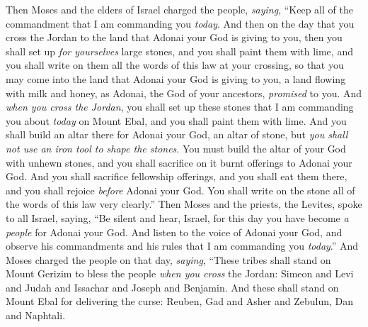 \begin{biblechapter} %
 Then Moses and the elders of Israel charged the people, \textit{saying}, “Keep all of the commandment that I am commanding you \textit{today}.
\verse And then on the day that you cross the Jordan to the land that Adonai your God is giving to you, then you shall set up \textit{for yourselves} large stones, and you shall paint them with lime,
\verse and you shall write on them all the words of this law at your crossing, so that you may come into the land that Adonai your God is giving to you, a land flowing with milk and honey, as Adonai, the God of your ancestors, \textit{promised} to you.
\verse And \textit{when you cross the Jordan}, you shall set up these stones that I am commanding you about \textit{today} on Mount Ebal, and you shall paint them with lime.
\verse And you shall build an altar there for Adonai your God, an altar of stone, but \textit{you shall not use an iron tool to shape the stones}.
\verse You must build the altar of your God with unhewn stones, and you shall sacrifice on it burnt offerings to Adonai your God.
\verse And you shall sacrifice fellowship offerings, and you shall eat them there, and you shall rejoice \textit{before} Adonai your God.
\verse You shall write on the stone all of the words of this law very clearly.”
\verse Then Moses and the priests, the Levites, spoke to all Israel, saying, “Be silent and hear, Israel, for this day you have become \textit{a people} for Adonai your God.
\verse And listen to the voice of Adonai your God, and observe his commandments and his rules that I am commanding you \textit{today}.”
 And Moses charged the people on that day, \textit{saying},
\verse “These tribes shall stand on Mount Gerizim to bless the people \textit{when you cross} the Jordan: Simeon and Levi and Judah and Issachar and Joseph and Benjamin.
\verse And these shall stand on Mount Ebal for delivering the curse: Reuben, Gad and Asher and Zebulun, Dan and Naphtali.

\end{biblechapter}
